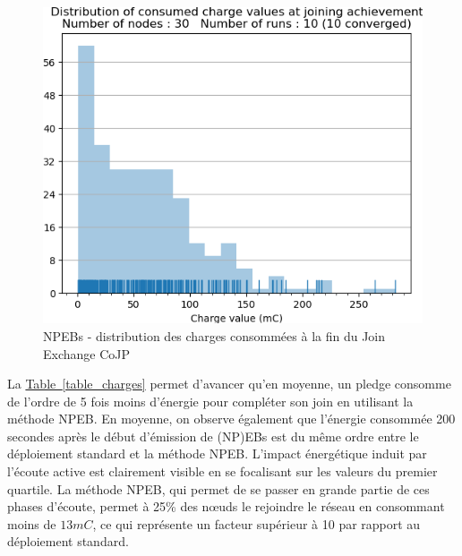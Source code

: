 \documentclass[]{report}
\newcommand{\wordlink}[2]{\hyperref[#2]{#1~\ref{#2}}}
\begin{document}
\begin{figure}[!ht]
\begin{minipage}{0.5\textwidth}
		\includegraphics[width=\textwidth]{results/NPEB/chargejoined.hist}
		\caption{NPEBs - distribution des charges consommées à la fin du Join Exchange CoJP}
		\label{fig:NPEBchargesjoined}
	\end{minipage}	
\end{figure}

La \wordlink{Table}{table_charges} permet d'avancer qu'en moyenne, un pledge consomme de l'ordre de 5 fois moins d'énergie pour compléter son join en utilisant la méthode NPEB. En moyenne, on observe également que l'énergie consommée 200 secondes après le début d'émission de (NP)EBs est du même ordre entre le déploiement standard et la méthode NPEB. L'impact énergétique induit par l'écoute active est clairement visible en se focalisant sur les valeurs du premier quartile. La méthode NPEB, qui permet de se passer en grande partie de ces phases d'écoute, permet à 25\% des nœuds le rejoindre le réseau en consommant moins de $13 mC$, ce qui représente un facteur supérieur à 10 par rapport au déploiement standard.
\end{document}
